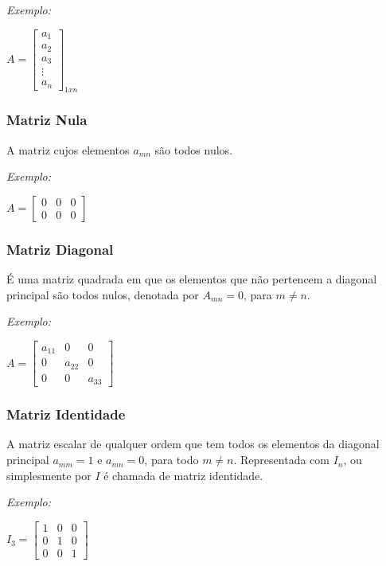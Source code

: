 \textit{Exemplo:}
\begin{center}
    $A = 
    \begin{bmatrix}
        a_{1} \\ 
        a_{2} \\
        a_{3} \\
        \vdots \\
        a_{n} 
    \end{bmatrix}_{1 x n}$
\end{center}

\subsubsection{Matriz Nula}
\noindent A matriz cujos elementos $a{}_{mn}$ são todos nulos.

\textit{Exemplo:}
\begin{center}
    $A = 
    \begin{bmatrix}
        0 & 0 & 0\\ 
        0 & 0 & 0 
    \end{bmatrix}$
\end{center}

\subsubsection{Matriz Diagonal}
\noindent É uma matriz quadrada em que os elementos que não pertencem a diagonal principal são todos nulos, denotada por $A{}_{mn} = 0$, para $m \neq n$.

\textit{Exemplo:}
\begin{center}
    $A = 
    \begin{bmatrix}
        a_{11} & 0 & 0 \\ 
        0 & a_{22} & 0 \\ 
        0 & 0 & a_{33}  
    \end{bmatrix}$
\end{center}

\subsubsection{Matriz Identidade}
\noindent A matriz escalar de qualquer ordem que tem todos os elementos da diagonal principal $a{}_{mm} = 1$ e $a_{mn} = 0$, para todo $m \neq n$. Representada com $I{}_{n}$, ou simplesmente por $I$ é chamada de matriz identidade.

\textit{Exemplo:}
\begin{center}
    $I_{3} = 
    \begin{bmatrix}
        1 & 0 & 0 \\ 
        0 & 1 & 0 \\ 
        0 & 0 & 1  
    \end{bmatrix}$
\end{center}

